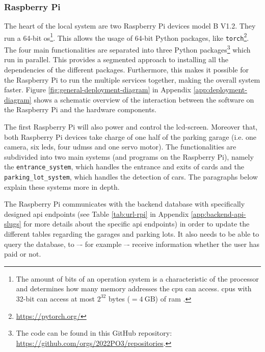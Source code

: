 \subsubsection{Raspberry Pi}
The heart of the local system are two Raspberry Pi devices model B V1.2. They run a 64-bit \ac{os}\footnote{The amount of bits of an operation system is a characteristic of the processor and determines how many memory addresses the \ac{cpu} can access. \ac{cpu}s with 32-bit can access at most $2^{32}$ bytes ($= 4 \ \text{GB}$) of \ac{ram} \cite{bit-cpu}.}. This allows the usage of 64-bit Python packages, like \texttt{torch}\footnote{\url{https://pytorch.org/}}. The four main functionalities are separated into three Python packages\footnote{The code can be found in this GitHub repository: \url{https://github.com/orgs/2022PO3/repositories}.} which run in parallel. This provides a segmented approach to installing all the dependencies of the different packages. Furthermore, this makes it possible for the Raspberry Pi to run the multiple services together, making the overall system faster. Figure \ref{fig:general-deployment-diagram} in Appendix \ref{app:deployment-diagram} shows a schematic overview of the interaction between the software on the Raspberry Pi and the hardware components. 

\ind The first Raspberry Pi will also power and control the \ac{lcd}-screen. Moreover that, both Raspberry Pi devices take charge of one half of the parking garage (i.e. one camera, six \acp{led}, four \acp{udms} and one servo motor). The functionalities are subdivided into two main systems (and programs on the Raspberry Pi), namely the \verb|entrance_system|, which handles the entrance and exits of cards and the \verb|parking_lot_system|, which handles the detection of cars. The paragraphs below explain these systems more in depth.

\ind The Raspberry Pi communicates with the backend database with specifically designed \ac{api} endpoints (see Table \ref{tab:url-rpi} in Appendix \ref{app:backend-api-slugs} for more details about the specific \ac{api} endpoints) in order to update the different tables regarding the garages and parking lots. It also needs to be able to query the database, to –- for example –- receive information whether the user has paid or not. 


